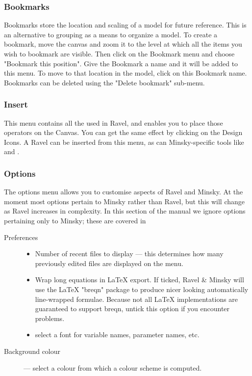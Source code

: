 \subsubsection{Bookmarks}
\label{Bookmarks}
Bookmarks store the location and scaling of a model for future reference. This is an alternative to grouping as a means to organize a model. To create a bookmark, move the canvas and zoom it to the level at which all the items you wish to bookmark are visible. Then click on the Bookmark menu and choose "Bookmark this position". Give the Bookmark a name and it will be added to this menu. To move to that location in the model, click on this Bookmark name. Bookmarks can be deleted using the "Delete bookmark" sub-menu.

\subsubsection{Insert}
\label{Insert}

This menu contains all the  used in Ravel, and enables you to place those operators on the Canvas. You can get the same effect by clicking on the Design Icons. A Ravel can be inserted from this menu, as can Minsky-specific tools like  and .


\subsubsection{Options}
\label{Options}

The options menu allows you to customise aspects of Ravel and Minsky. At the moment most options pertain to Minsky rather than Ravel, but this will change as Ravel increases in complexity. In this section of the manual we ignore options pertaining only to Minsky; these are covered in 

\begin{description}
\item[Preferences]\mbox{}

\begin{itemize}
\item Number of recent files to display --- this determines how many previously edited files are displayed on the  menu.
\item\label{wrap-equations} Wrap long equations in LaTeX export. If ticked, Ravel \& Minsky will use the LaTeX "breqn" package to produce nicer looking automatically line-wrapped formulae. Because not all LaTeX implementations are guaranteed to support breqn, untick this option if you encounter problems.
\item\label{font} select a font for variable names, parameter names, etc.
\end{itemize}

\item[Background colour] --- select a colour from which a colour scheme is computed.

\end{description}

